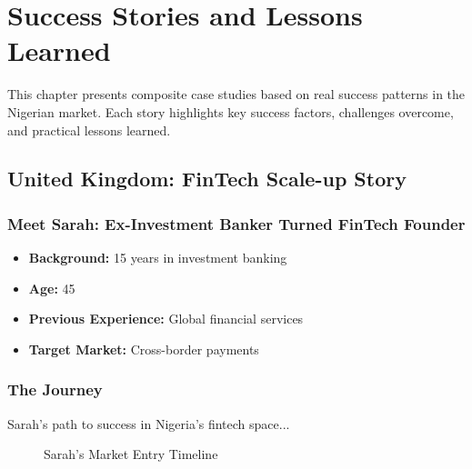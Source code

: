 
\chapter{Success Stories and Lessons Learned}

\begin{importantbox}
This chapter presents composite case studies based on real success patterns in the Nigerian market. Each story highlights key success factors, challenges overcome, and practical lessons learned.
\end{importantbox}

\section{United Kingdom: FinTech Scale-up Story}

\subsection{Meet Sarah: Ex-Investment Banker Turned FinTech Founder}
\begin{tcolorbox}[colback=white,colframe=primarydark,title=\textbf{Entrepreneur Profile}]
\begin{itemize}
    \item \textbf{Background:} 15 years in investment banking
    \item \textbf{Age:} 45
    \item \textbf{Previous Experience:} Global financial services
    \item \textbf{Target Market:} Cross-border payments
\end{itemize}
\end{tcolorbox}

\subsection{The Journey}
Sarah's path to success in Nigeria's fintech space...

\begin{figure}[h]
    \centering
    \caption{Sarah's Market Entry Timeline}
\end{figure}

